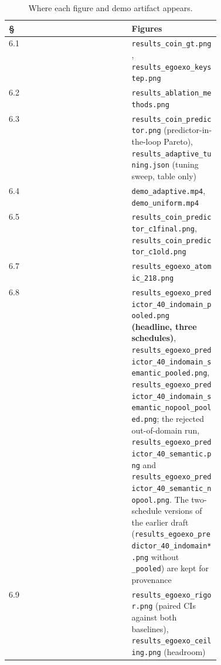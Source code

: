 \begin{table}[htbp]
\centering\small
\caption{Where each figure and demo artifact appears.}
\label{tab:figure-map}
\begin{tabular}{lp{0.42\linewidth}}
\toprule
\textbf{\S} & \textbf{Figures} \\
\midrule
6.1 & \texttt{results\_coin\_gt.png}, \texttt{results\_egoexo\_keystep.png} \\
6.2 & \texttt{results\_ablation\_methods.png} \\
6.3 & \texttt{results\_coin\_predictor.png} (predictor-in-the-loop Pareto), \texttt{results\_adaptive\_tuning.json} (tuning sweep, table only) \\
6.4 & \texttt{demo\_adaptive.mp4}, \texttt{demo\_uniform.mp4} \\
6.5 & \texttt{results\_coin\_predictor\_c1final.png}, \texttt{results\_coin\_predictor\_c1old.png} \\
6.7 & \texttt{results\_egoexo\_atomic\_218.png} \\
6.8 & \texttt{results\_egoexo\_predictor\_40\_indomain\_pooled.png} \textbf{(headline, three schedules)}, \texttt{results\_egoexo\_predictor\_40\_indomain\_semantic\_pooled.png}, \texttt{results\_egoexo\_predictor\_40\_indomain\_semantic\_nopool\_pooled.png}; the rejected out-of-domain run, \texttt{results\_egoexo\_predictor\_40\_semantic.png} and \texttt{results\_egoexo\_predictor\_40\_semantic\_nopool.png}. The two-schedule versions of the earlier draft (\texttt{results\_egoexo\_predictor\_40\_indomain*.png} without \texttt{\_pooled}) are kept for provenance \\
6.9 & \texttt{results\_egoexo\_rigor.png} (paired CIs against both baselines), \texttt{results\_egoexo\_ceiling.png} (headroom) \\
\bottomrule
\end{tabular}
\end{table}
